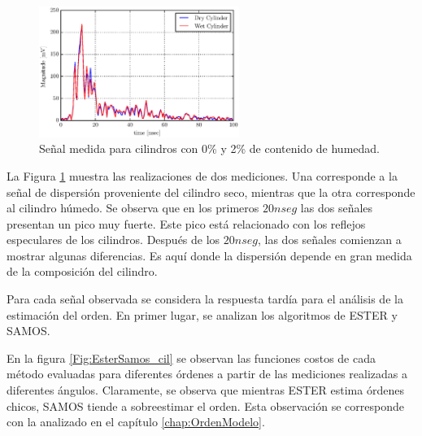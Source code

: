	\begin{figure}[ht]
		\centerline{\includegraphics[width=6.5cm]{Figuras/senales}}
		\caption{Señal medida  para cilindros con 0\% y 2\% de contenido de humedad.}
		\label{Fig:backscattered}
	\end{figure}
	
	La Figura \ref{Fig:backscattered} muestra las realizaciones de dos mediciones. Una corresponde a la señal de dispersión proveniente del cilindro seco, mientras que la otra corresponde al cilindro húmedo. Se observa que en los primeros $20 nseg$ las dos señales presentan un pico muy fuerte. Este pico está relacionado con los reflejos especulares de los cilindros. Después de los $20 nseg$, las dos señales comienzan a mostrar algunas diferencias. Es aquí donde la dispersión depende en gran medida de la composición del cilindro.

     Para cada señal observada se considera la respuesta tardía para el análisis de la estimación del orden. En primer lugar, se analizan los algoritmos de ESTER y SAMOS. 

    En la figura \ref{Fig:EsterSamos_cil} se observan las funciones costos de cada método evaluadas para diferentes órdenes a partir de las mediciones realizadas a diferentes ángulos. Claramente, se observa que mientras ESTER estima órdenes chicos, SAMOS tiende a sobreestimar el orden. Esta observación se corresponde con la analizado en el capítulo \ref{chap:OrdenModelo}. 

